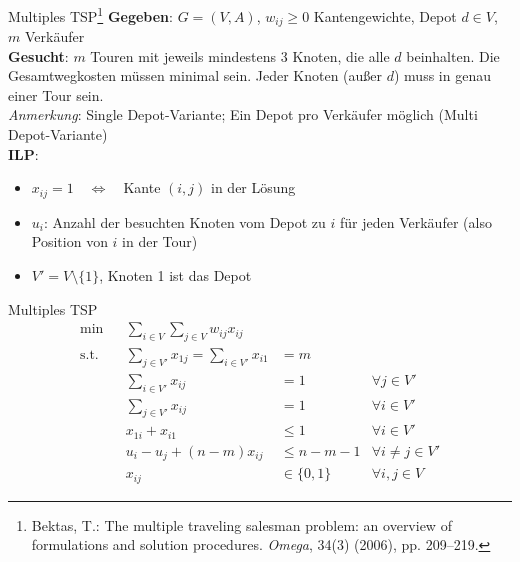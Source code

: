 \documentclass[ngerman,aspectratio=169,10pt]{beamer}
\begin{document}
\begin{frame}{Multiples TSP\footnote{Bektas, T.: The multiple traveling salesman problem: an overview of formulations and solution procedures. \emph{Omega}, 34(3) (2006), pp. 209–219.}}
	\textbf{Gegeben}: $G=(V,A)$, $w_{ij}\geq0$ Kantengewichte, Depot $d\in V$, $m$ Verkäufer\\
	\textbf{Gesucht}: $m$ Touren mit jeweils mindestens 3 Knoten, die alle $d$ beinhalten. Die Gesamtwegkosten müssen minimal sein. Jeder Knoten (außer $d$) muss in genau einer Tour sein.\\
	\emph{Anmerkung}: Single Depot-Variante; Ein Depot pro Verkäufer möglich (Multi Depot-Variante)\\

	\textbf{ILP}:
	\begin{itemize}
		\item $x_{ij}=1\quad\Leftrightarrow\quad$Kante $(i,j)$ in der Lösung
		\item $u_i$: Anzahl der besuchten Knoten vom Depot zu $i$ für jeden Verkäufer (also Position von $i$ in der Tour)
		\item $V'=V\setminus\{1\}$, Knoten 1 ist das Depot
	\end{itemize}
\end{frame}
\begin{frame}{Multiples TSP}
	\begin{align*}
	\min && \sum_{i\in V}\sum_{j\in V}w_{ij}x_{ij}&&\\
	\text{s.t.} && \sum_{j\in V'}x_{1j}=\sum_{i\in V'}x_{i1}&=m&\\
	&& \sum_{i\in V'}x_{ij} &=1 &\forall j\in V'\\
	&& \sum_{j\in V'}x_{ij} &=1 &\forall i\in V'\\
	&& x_{1i}+x_{i1} &\leq1 &\forall i\in V'\\
	&& u_i-u_j+(n-m)x_{ij} &\leq n-m-1 &\forall i\neq j\in V'\\
	&& x_{ij} &\in\{0,1\} &\forall i,j\in V
	\end{align*}
\end{frame}
\end{document}
